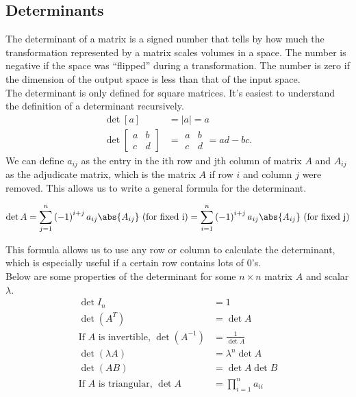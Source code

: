\subsection{Determinants}
\noindent
The determinant of a matrix is a signed number that tells by how much the transformation represented by a matrix scales volumes in a space.
The number is negative if the space was ``flipped'' during a transformation.
The number is zero if the dimension of the output space is less than that of the input space.\\

\noindent
The determinant is only defined for square matrices. It's easiest to understand the definition of a determinant recursively.
\begin{align*}
	\det{\left[ a \right]} &= \lvert a \rvert = a \\
	\det{\left[
		\begin{array}{cc}
			a & b \\
			c & d
		\end{array}
		\right]} &= \begin{array}{|cc|}
		a & b \\
		c & d
	\end{array} = ad - bc.
\end{align*}
We can define $a_{ij}$ as the entry in the ith row and jth column of matrix $A$ and $A_{ij}$ as the adjudicate matrix, which is the matrix $A$ if row $i$ and column $j$ were removed. This allows us to write a general formula for the determinant.
\begin{definition}
	\begin{equation*}
		\det{A} = \sum_{j=1}^{n}{\left(-1\right)^{i+j}a_{ij}\abs{A_{ij}}} \text{ (for fixed i)} = \sum_{i=1}^{n}{\left(-1\right)^{i+j}a_{ij}\abs{A_{ij}}} \text{ (for fixed j)}
	\end{equation*}
\end{definition}
\noindent
This formula allows us to use any row or column to calculate the determinant, which is especially useful if a certain row contains lots of 0's.\\

\noindent
Below are some properties of the determinant for some $n \times n$ matrix $A$ and scalar $\lambda$.
\begin{align*}
	\det{I_n} &= 1 \\
	\det{(A^T)} &= \det{A} \\
	\text{If $A$ is invertible, } \det{(A^{-1})} &= \frac{1}{\det{A}} \\
	\det{(\lambda A)} &= \lambda^n\det{A} \\
	\det{(AB)} &= \det{A}\det{B} \\
	\text{If $A$ is triangular, } \det{A} &= \prod_{i=1}^{n}{a_{ii}}
\end{align*}

